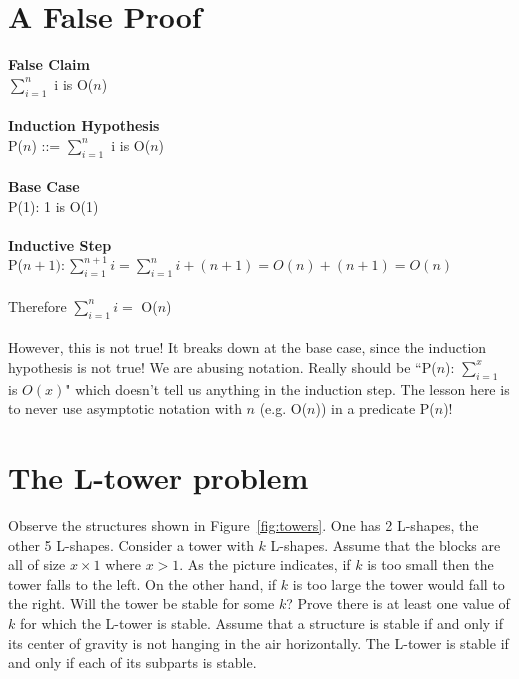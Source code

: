 \documentclass[12pt]{article}
\begin{document}


\newcommand{\bigbox}{\fbox{\vspace{0.5in} \hspace{0.75in}}}

\section{A False Proof}
\textbf{False Claim}\\
$\sum_{i=1}^{n}$ i is O($n$)\\
\\
\textbf{Induction Hypothesis}\\
P($n$) ::= $\sum_{i=1}^{n}$ i is O($n$)\\
\\
\textbf{Base Case}\\
P(1): 1 is O(1)\\
\\
\textbf{Inductive Step}\\
P($n+1): \sum_{i=1}^{n+1} i  = \sum_{i=1}^n i + (n+1) = O(n) + (n+1) = O(n)$\\
\\
Therefore $\sum_{i=1}^n i =$ O($n$)\\
\\
However, this is not true! It breaks down at the base case, since the induction hypothesis is not true! We are abusing notation. Really should be ``P($n$): $\sum_{i=1}^x$ is $O(x)$" which doesn't tell us anything in the induction step. The lesson here is to never use asymptotic notation with $n$ (e.g. O($n$)) in a predicate P($n$)!

\section{The L-tower problem}


Observe the structures shown in Figure~\ref{fig:towers}.  One has 2 L-shapes, the other 5 L-shapes. Consider a tower with $k$ L-shapes.  Assume that the blocks are all of size $x\times 1$ where $x > 1$. As the picture indicates,  if $k$ is too small then the tower falls to the left. On the other hand, if $k$ is too large the tower would fall to the right. Will the tower be stable for some $k$?  Prove there is at least one value of $k$ for which the L-tower is stable.  Assume that a structure is stable if and only if its center of gravity is not hanging in the air horizontally. The L-tower is stable if and only if each of its subparts is stable.   \\
\end{document}
